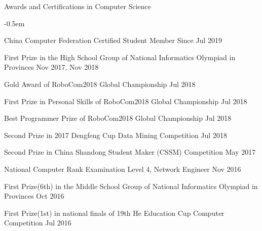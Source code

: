 \documentclass[UTF8]{resume} %
\begin{document}
\begin{rSection}{Awards and Certifications in Computer Science}
    \begin{list}{}{
        \setlength{\leftmargin}{0.0em}
        \itemsep -0.5em
      }

    
    \item China Computer Federation Certified Student Member \hfill Since Jul 2019

    \item First Prize in the High School Group of National Informatics Olympiad in Provinces \hfill Nov 2017, Nov 2018
    \item Gold Award of RoboCom2018 Global Championship \hfill Jul 2018
    \item First Prize in Personal Skills of RoboCom2018 Global Championship \hfill Jul 2018
    \item Best Programmer Prize of RoboCom2018 Global Championship \hfill Jul 2018
    \item Second Prize in 2017 Dengfeng Cup Data Mining Competition \hfill Jul 2018
    \item Second Prize in China Shandong Student Maker (CSSM) Competition \hfill May 2017
    \item National Computer Rank Examination Level 4, Network Engineer \hfill Nov 2016
    \item First Prize(6th) in the Middle School Group of National Informatics Olympiad in Provinces \hfill Oct 2016
    \item First Prize(1st) in national finals of 19th He Education Cup Computer Competition \hfill Jul 2016
    
    \end{list}
\end{rSection}
\end{document}
